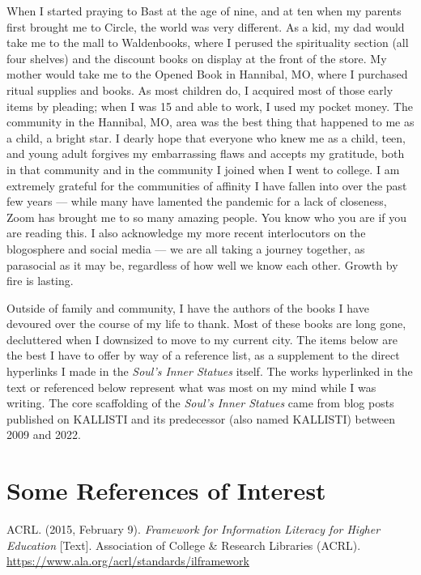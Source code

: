 \documentclass[
]{book}
\begin{document}
When I started praying to Bast at the age of nine, and at ten when my parents first brought me to Circle, the world was very different. As a kid, my dad would take me to the mall to Waldenbooks, where I perused the spirituality section (all four shelves) and the discount books on display at the front of the store. My mother would take me to the Opened Book in Hannibal, MO, where I purchased ritual supplies and books. As most children do, I acquired most of those early items by pleading; when I was 15 and able to work, I used my pocket money. The community in the Hannibal, MO, area was the best thing that happened to me as a child, a bright star. I dearly hope that everyone who knew me as a child, teen, and young adult forgives my embarrassing flaws and accepts my gratitude, both in that community and in the community I joined when I went to college. I am extremely grateful for the communities of affinity I have fallen into over the past few years --- while many have lamented the pandemic for a lack of closeness, Zoom has brought me to so many amazing people. You know who you are if you are reading this. I also acknowledge my more recent interlocutors on the blogosphere and social media --- we are all taking a journey together, as parasocial as it may be, regardless of how well we know each other. Growth by fire is lasting.

Outside of family and community, I have the authors of the books I have devoured over the course of my life to thank. Most of these books are long gone, decluttered when I downsized to move to my current city. The items below are the best I have to offer by way of a reference list, as a supplement to the direct hyperlinks I made in the \emph{Soul's Inner Statues} itself. The works hyperlinked in the text or referenced below represent what was most on my mind while I was writing. The core scaffolding of the \emph{Soul's Inner Statues} came from blog posts published on KALLISTI and its predecessor (also named KALLISTI) between 2009 and 2022.

\hypertarget{some-references-of-interest}{%
\section{Some References of Interest}\label{some-references-of-interest}}

ACRL. (2015, February 9). \emph{Framework for Information Literacy for Higher Education} {[}Text{]}. Association of College \& Research Libraries (ACRL). \url{https://www.ala.org/acrl/standards/ilframework}
\end{document}
